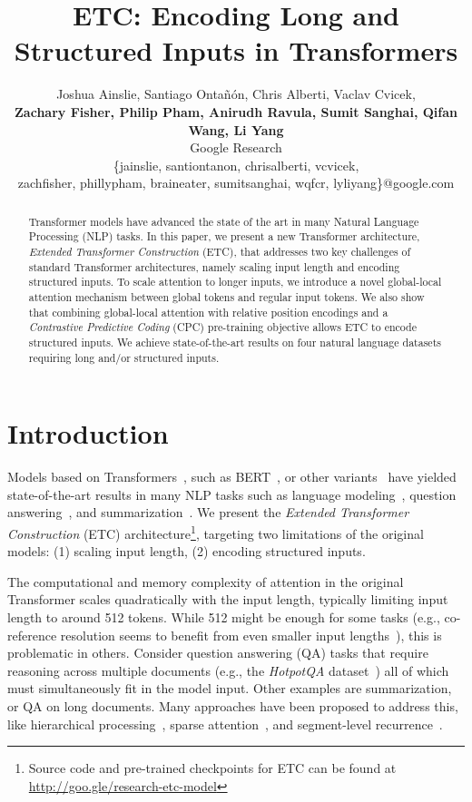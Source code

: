 \documentclass[11pt,a4paper]{article}
\title{ETC: Encoding Long and Structured Inputs in Transformers}
\author{Joshua Ainslie, Santiago Onta\~{n}\'{o}n, Chris Alberti, Vaclav Cvicek, \\ {\bf Zachary Fisher, Philip Pham, Anirudh Ravula, Sumit Sanghai, Qifan Wang, Li Yang} \\
  Google Research \\
  \{jainslie, santiontanon, chrisalberti, vcvicek, \\ zachfisher, phillypham, braineater, sumitsanghai, wqfcr, lyliyang\}@google.com 
}
\date{}
\begin{document}
\maketitle
\begin{abstract}
Transformer models have advanced the state of the art in many Natural Language Processing (NLP) tasks. In this paper, we present a new Transformer architecture, {\em Extended Transformer Construction} (ETC), that addresses two key challenges of standard Transformer architectures, namely scaling input length and encoding structured inputs. To scale attention to longer inputs, we introduce a novel global-local attention mechanism between global tokens and regular input tokens. We also show that combining global-local attention with relative position encodings and a {\em Contrastive Predictive Coding} (CPC) pre-training objective allows ETC to encode structured inputs. We achieve state-of-the-art results on four natural language datasets requiring long and/or structured inputs.
\end{abstract}

\section{Introduction}



Models based on Transformers~\cite{vaswani2017attention}, such as BERT~\cite{devlin2018bert}, or other variants~\cite{yang2019xlnet,lan2019albert,raffel2019exploring} have yielded state-of-the-art results in many NLP tasks such as language modeling~\cite{child2019generating,sukhbaatar2019adaptive,rae2019compressive,kitaev2020reformer}, question answering~\cite{lan2019albert,beltagy2020longformer}, and summarization~\cite{zhang2019hibert}. 
We present the {\em Extended Transformer Construction} (ETC) architecture\footnote{Source code and pre-trained checkpoints for ETC can be found at \url{http://goo.gle/research-etc-model}}, targeting two limitations of the original models: (1) scaling input length, (2) encoding structured inputs.

The computational and memory complexity of attention in the original Transformer scales quadratically with the input length, typically limiting input length to around 512 tokens. While 512 might be enough for some tasks (e.g., co-reference resolution seems to benefit from even smaller input lengths~\cite{joshi2019bert}), this is problematic in others. Consider question answering (QA) tasks that require reasoning across multiple documents (e.g., the {\em HotpotQA} dataset~\cite{yang2018hotpotqa}) all of which must simultaneously fit in the model input. Other examples are summarization, or QA on long documents. Many approaches have been proposed to address this, like hierarchical processing~\cite{zhang2019hibert}, sparse attention~\cite{child2019generating}, and segment-level recurrence~\cite{dai2019transformer}.
\end{document}
